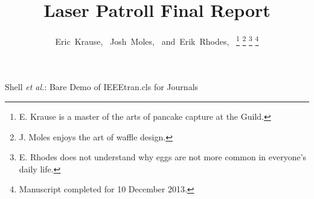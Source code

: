 \documentclass[journal]{IEEEtran}
\begin{document}
%
\title{Laser Patroll Final Report}
%
%
%

\author{Eric~Krause,~
        Josh~Moles,~
        and~Erik~Rhodes,~%
\thanks{E. Krause is a master of the arts of pancake capture at the Guild.}%
\thanks{J. Moles enjoys the art of waffle design.}%
\thanks{E. Rhodes does not understand why eggs are not more common in everyone's daily life.}%
\thanks{Manuscript completed for 10 December 2013.}}

% 
%



%
{Shell \MakeLowercase{\textit{et al.}}: Bare Demo of IEEEtran.cls for Journals}
% 
\end{document}

